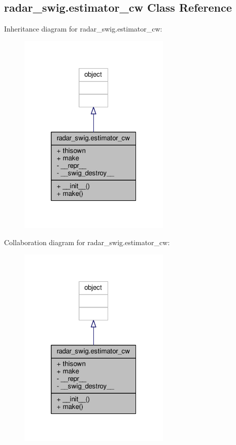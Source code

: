 \subsection{radar\+\_\+swig.\+estimator\+\_\+cw Class Reference}
\label{classradar__swig_1_1estimator__cw}


Inheritance diagram for radar\+\_\+swig.\+estimator\+\_\+cw\+:
\nopagebreak
\begin{figure}[H]
\begin{center}
\leavevmode
\includegraphics[width=205pt]{df/d40/classradar__swig_1_1estimator__cw__inherit__graph}
\end{center}
\end{figure}


Collaboration diagram for radar\+\_\+swig.\+estimator\+\_\+cw\+:
\nopagebreak
\begin{figure}[H]
\begin{center}
\leavevmode
\includegraphics[width=205pt]{d2/d93/classradar__swig_1_1estimator__cw__coll__graph}
\end{center}
\end{figure}
